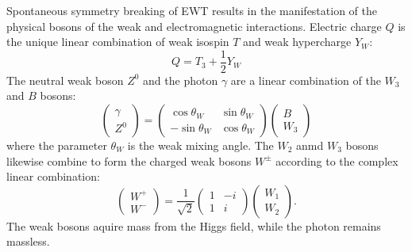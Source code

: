 Spontaneous symmetry breaking of EWT results in the manifestation of the physical bosons of the weak and electromagnetic interactions.
Electric charge $Q$ is the unique linear combination of weak isospin $T$ and weak hypercharge $Y_W$:
\begin{equation}
    Q = T_3 +\frac{1}{2}Y_W
\end{equation}
The neutral weak boson $Z^0$ and the photon $\gamma$ are a linear combination of the $W_3$ and $B$ bosons:
\begin{equation}
    \left(
    \begin{matrix}
        \gamma \\
        Z^0
    \end{matrix}
    \right)
    =
    \left(
    \begin{matrix}
        \cos\theta_W & \sin\theta_W \\
        -\sin\theta_W & \cos\theta_W
    \end{matrix}
    \right)
    \left(
    \begin{matrix}
        B \\
        W_3
    \end{matrix}
    \right)
\end{equation} 
where the parameter $\theta_W$ is the weak mixing angle. The $W_2$ anmd $W_3$ bosons likewise combine to form the charged weak bosons $W^{\pm}$ according to the complex linear combination:
\begin{equation}
    \left(
    \begin{matrix}
        W^+ \\
        W^-
    \end{matrix}
    \right)
    =
    \frac{1}{\sqrt{2}}
    \left(
    \begin{matrix}
        1 & -i \\
        1 & i
    \end{matrix}
    \right)
    \left(
    \begin{matrix}
        W_1 \\
        W_2
    \end{matrix}
    \right).
\end{equation}
The weak bosons aquire mass from the Higgs field, while the photon remains massless. 

